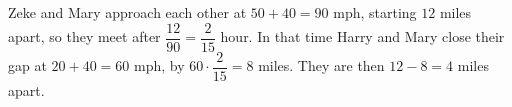 Zeke and Mary approach each other at $50+40=90$ mph, starting $12$ miles apart, so they meet after $\dfrac{12}{90}=\dfrac{2}{15}$ hour. In that time Harry and Mary close their gap at $20+40=60$ mph, by $60\cdot\dfrac{2}{15}=8$ miles. They are then $12-8=\boxed{4}$ miles apart.
